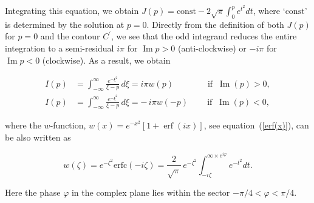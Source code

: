 \documentclass[draft]{agujournal2019}
\begin{document}
{Integrating this equation, we obtain $J(p)=\mathrm{const}-2\sqrt{\pi}\int%
_{0}^{p}e^{t^{2}}dt$, where `$\mathrm{const}$' is determined by the solution at
$p=0$. Directly from the definition of both $J(p)$ for $p=0$ and the contour
$C^{\prime}$, we see that the odd integrand reduces the entire integration to
a semi-residual $i\pi$ for $\operatorname{Im}p>0$ (anti-clockwise) or $-i\pi$
for $\operatorname{Im}p<0$ (clockwise). As a result, we obtain
\begin{linenomath*}
\begin{subequations}
\begin{align}
I(p)  &  =\int_{-\infty}^{\infty}\frac{e^{-\xi^{2}}}{\xi-p}\,d\xi=i\pi
w(p)\qquad\qquad\text{if}\;\;\operatorname{Im}(p)>0,\label{Im_p>0}\\
I(p)  &  =\int_{-\infty}^{\infty}\frac{e^{-\xi^{2}}}{\xi-p}\,d\xi=-\,i\pi
w(-p)\ \qquad\text{if}\;\;\operatorname{Im}(p)<0,\label{Im_p<0}
\end{align}
\label{Iw}
\end{subequations}
\end{linenomath*}

where the $w$-function, $w(x)=e^{-x^{2}}[1+\operatorname{erf}(ix)]$, 
see equation~(\ref{erf(x)}), can be also written as  \cite{Abramowitz:Handbook88}
\begin{linenomath*}
\begin{equation}
w(\zeta)=e^{-\zeta^{2}}\mathrm{erfc}(-i\zeta)=\frac{2}%
{\sqrt{\pi}}\,e^{-\zeta^{2}}\int_{-i\zeta}^{\infty\times e^{i\varphi}%
}e^{-t^{2}}dt.
\label{ww}
\end{equation}
\end{linenomath*}
Here the phase $\varphi$ in the complex plane lies within the sector
$-\pi/4<\varphi<\pi/4$. 

}
\end{document}
